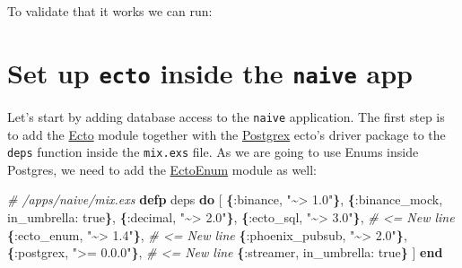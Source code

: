 \documentclass[
  oneside]{book}
\newenvironment{Shaded}{\begin{snugshade}}{\end{snugshade}}
\newcommand{\AttributeTok}[1]{\textcolor[rgb]{0.13,0.29,0.53}{#1}}
\newcommand{\CommentTok}[1]{\textcolor[rgb]{0.56,0.35,0.01}{\textit{#1}}}
\newcommand{\ConstantTok}[1]{\textcolor[rgb]{0.56,0.35,0.01}{#1}}
\newcommand{\ExtensionTok}[1]{#1}
\newcommand{\FunctionTok}[1]{\textcolor[rgb]{0.13,0.29,0.53}{\textbf{#1}}}
\newcommand{\KeywordTok}[1]{\textcolor[rgb]{0.13,0.29,0.53}{\textbf{#1}}}
\newcommand{\NormalTok}[1]{#1}
\newcommand{\OperatorTok}[1]{\textcolor[rgb]{0.81,0.36,0.00}{\textbf{#1}}}
\newcommand{\OtherTok}[1]{\textcolor[rgb]{0.56,0.35,0.01}{#1}}
\newcommand{\StringTok}[1]{\textcolor[rgb]{0.31,0.60,0.02}{#1}}
\newcommand{\VariableTok}[1]{\textcolor[rgb]{0.00,0.00,0.00}{#1}}
\begin{document}
To validate that it works we can run:

\begin{Shaded}
\end{Shaded}

\section{\texorpdfstring{Set up \texttt{ecto} inside the \texttt{naive} app}{Set up ecto inside the naive app}}\label{set-up-ecto-inside-the-naive-app}

Let's start by adding database access to the \texttt{naive} application. The first step is to add the \href{https://github.com/elixir-ecto/ecto}{Ecto} module together with the \href{https://github.com/elixir-ecto/postgrex}{Postgrex} ecto's driver package to the \texttt{deps} function inside the \texttt{mix.exs} file. As we are going to use Enums inside Postgres, we need to add the \href{https://github.com/gjaldon/ecto_enum}{EctoEnum} module as well:

\begin{Shaded}
\begin{Highlighting}[]
  \CommentTok{\# /apps/naive/mix.exs}
  \KeywordTok{defp}\NormalTok{ deps }\KeywordTok{do}
    \OtherTok{[}
      \FunctionTok{\{}\VariableTok{:binance}\NormalTok{, }\StringTok{"\textasciitilde{}\textgreater{} 1.0"}\FunctionTok{\}}\NormalTok{,}
      \FunctionTok{\{}\VariableTok{:binance\_mock}\NormalTok{, }\VariableTok{in\_umbrella:} \ConstantTok{true}\FunctionTok{\}}\NormalTok{,}
      \FunctionTok{\{}\VariableTok{:decimal}\NormalTok{, }\StringTok{"\textasciitilde{}\textgreater{} 2.0"}\FunctionTok{\}}\NormalTok{,}
      \FunctionTok{\{}\VariableTok{:ecto\_sql}\NormalTok{, }\StringTok{"\textasciitilde{}\textgreater{} 3.0"}\FunctionTok{\}}\NormalTok{,     }\CommentTok{\# \textless{}= New line}
      \FunctionTok{\{}\VariableTok{:ecto\_enum}\NormalTok{, }\StringTok{"\textasciitilde{}\textgreater{} 1.4"}\FunctionTok{\}}\NormalTok{,    }\CommentTok{\# \textless{}= New line}
      \FunctionTok{\{}\VariableTok{:phoenix\_pubsub}\NormalTok{, }\StringTok{"\textasciitilde{}\textgreater{} 2.0"}\FunctionTok{\}}\NormalTok{,}
      \FunctionTok{\{}\VariableTok{:postgrex}\NormalTok{, }\StringTok{"\textgreater{}= 0.0.0"}\FunctionTok{\}}\NormalTok{,   }\CommentTok{\# \textless{}= New line}
      \FunctionTok{\{}\VariableTok{:streamer}\NormalTok{, }\VariableTok{in\_umbrella:} \ConstantTok{true}\FunctionTok{\}}
    \OtherTok{]}
  \KeywordTok{end}
\end{Highlighting}
\end{Shaded}
\end{document}

